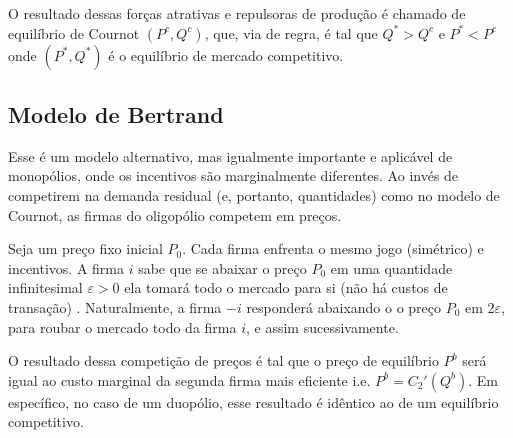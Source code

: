 O resultado dessas forças atrativas e repulsoras de produção é chamado de equilíbrio de Cournot $(P^c,Q^c)$, que, via de regra, é tal que $Q^*>Q^c$ e $P^*<P^c$ onde $(P^*,Q^*)$ é o equilíbrio de mercado competitivo. 
\subsection{Modelo de Bertrand}
Esse é um modelo alternativo, mas igualmente importante e aplicável de monopólios, onde os incentivos são marginalmente diferentes. Ao invés de competirem na demanda residual (e, portanto, quantidades) como no modelo de Cournot, as firmas do oligopólio competem em preços.

Seja um preço fixo inicial $P_0$. Cada firma enfrenta o mesmo jogo (simétrico) e incentivos. A firma $i$ sabe que se abaixar o preço $P_0$ em uma quantidade infinitesimal $\varepsilon>0$ ela tomará todo o mercado para si (não há custos de transação) . Naturalmente, a firma $-i$ responderá abaixando o o preço $P_0$ em $2\varepsilon$, para roubar o mercado todo da firma $i$, e assim sucessivamente. 

O resultado dessa competição de preços é tal que o preço de equilíbrio $P^b$ será igual ao custo marginal da segunda firma mais eficiente i.e. $P^b=C_2'(Q^b)$. Em específico, no caso de um duopólio, esse resultado é idêntico ao de um equilíbrio competitivo.

